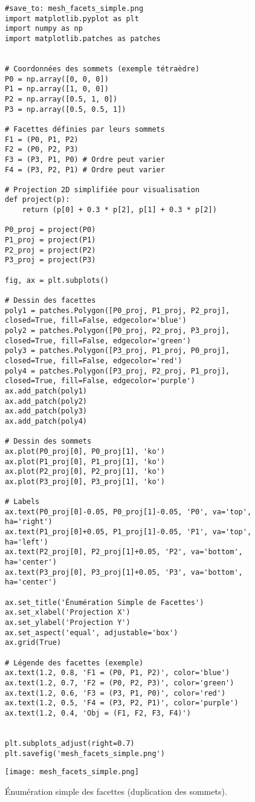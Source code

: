\documentclass{article}
\begin{document}
\begin{figure}[H]
    \centering
    \begin{verbatim}
#save_to: mesh_facets_simple.png
import matplotlib.pyplot as plt
import numpy as np
import matplotlib.patches as patches


# Coordonnées des sommets (exemple tétraèdre)
P0 = np.array([0, 0, 0])
P1 = np.array([1, 0, 0])
P2 = np.array([0.5, 1, 0])
P3 = np.array([0.5, 0.5, 1])

# Facettes définies par leurs sommets
F1 = (P0, P1, P2)
F2 = (P0, P2, P3)
F3 = (P3, P1, P0) # Ordre peut varier
F4 = (P3, P2, P1) # Ordre peut varier

# Projection 2D simplifiée pour visualisation
def project(p):
    return (p[0] + 0.3 * p[2], p[1] + 0.3 * p[2])

P0_proj = project(P0)
P1_proj = project(P1)
P2_proj = project(P2)
P3_proj = project(P3)

fig, ax = plt.subplots()

# Dessin des facettes
poly1 = patches.Polygon([P0_proj, P1_proj, P2_proj], closed=True, fill=False, edgecolor='blue')
poly2 = patches.Polygon([P0_proj, P2_proj, P3_proj], closed=True, fill=False, edgecolor='green')
poly3 = patches.Polygon([P3_proj, P1_proj, P0_proj], closed=True, fill=False, edgecolor='red')
poly4 = patches.Polygon([P3_proj, P2_proj, P1_proj], closed=True, fill=False, edgecolor='purple')
ax.add_patch(poly1)
ax.add_patch(poly2)
ax.add_patch(poly3)
ax.add_patch(poly4)

# Dessin des sommets
ax.plot(P0_proj[0], P0_proj[1], 'ko')
ax.plot(P1_proj[0], P1_proj[1], 'ko')
ax.plot(P2_proj[0], P2_proj[1], 'ko')
ax.plot(P3_proj[0], P3_proj[1], 'ko')

# Labels
ax.text(P0_proj[0]-0.05, P0_proj[1]-0.05, 'P0', va='top', ha='right')
ax.text(P1_proj[0]+0.05, P1_proj[1]-0.05, 'P1', va='top', ha='left')
ax.text(P2_proj[0], P2_proj[1]+0.05, 'P2', va='bottom', ha='center')
ax.text(P3_proj[0], P3_proj[1]+0.05, 'P3', va='bottom', ha='center')

ax.set_title('Énumération Simple de Facettes')
ax.set_xlabel('Projection X')
ax.set_ylabel('Projection Y')
ax.set_aspect('equal', adjustable='box')
ax.grid(True)

# Légende des facettes (exemple)
ax.text(1.2, 0.8, 'F1 = (P0, P1, P2)', color='blue')
ax.text(1.2, 0.7, 'F2 = (P0, P2, P3)', color='green')
ax.text(1.2, 0.6, 'F3 = (P3, P1, P0)', color='red')
ax.text(1.2, 0.5, 'F4 = (P3, P2, P1)', color='purple')
ax.text(1.2, 0.4, 'Obj = (F1, F2, F3, F4)')


plt.subplots_adjust(right=0.7)
plt.savefig('mesh_facets_simple.png')

    \end{verbatim}
    \texttt{[image: mesh\_facets\_simple.png]}
    \caption{Énumération simple des facettes (duplication des sommets).}
    \label{fig:mesh_facets_simple}
\end{figure}
\end{document}
